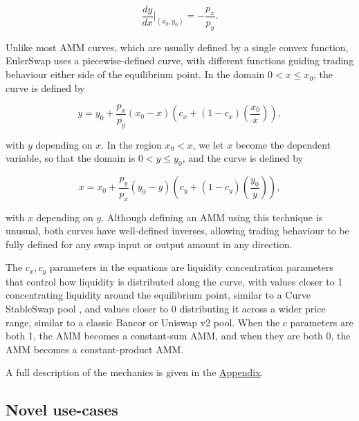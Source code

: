 \documentclass{article}
\begin{document}
\begin{equation}
    \frac{dy}{dx} \Big|_{(x_0, y_0)} 
    = 
    -\frac{p_x}{p_y}.
\end{equation}

Unlike most AMM curves, which are usually defined by a single convex function, EulerSwap uses a piecewise-defined curve, with different functions guiding trading behaviour either side of the equilibrium point. In the domain $0 < x \leq x_0$, the curve is defined by

\begin{equation}
\label{eq:euler-swap-main-y}
    y
    =
    y_{0}+\frac{p_{x}}{p_{y}}\left(x_{0}-x\right)\left(c_{x}+\left(1-c_{x}\right)\left(\frac{x_{0}}{x}\right)\right),
\end{equation}

with $y$ depending on $x$. In the region $x_0 < x$, we let $x$ become the dependent variable, so that the domain is $0 < y \leq y_0$, and the curve is defined by

\begin{equation}
\label{eq:euler-swap-main-x}
    x
    =
    x_{0}+\frac{p_{y}}{p_{x}}\left(y_{0}-y\right)\left(c_{y}+\left(1-c_{y}\right)\left(\frac{y_{0}}{y}\right)\right),
\end{equation}

with $x$ depending on $y$. Although defining an AMM using this technique is unusual, both curves have well-defined inverses, allowing trading behaviour to be fully defined for any swap input or output amount in any direction.

The $c_x, c_y$ parameters in the equations are liquidity concentration parameters that control how liquidity is distributed along the curve, with values closer to 1 concentrating liquidity around the equilibrium point, similar to a Curve StableSwap pool \cite{egorovStableSwap}, and values closer to 0 distributing it across a wider price range, similar to a classic Bancor \cite{bancorWhitepaper} or Uniswap v2 \cite{uniswapv2whitepaper} pool. When the $c$ parameters are both 1, the AMM becomes a constant-sum AMM, and when they are both 0, the AMM becomes a constant-product AMM.

A full description of the mechanics is given in the \hyperref[sec:appendix]{Appendix}.

\subsection{Novel use-cases}
\end{document}
